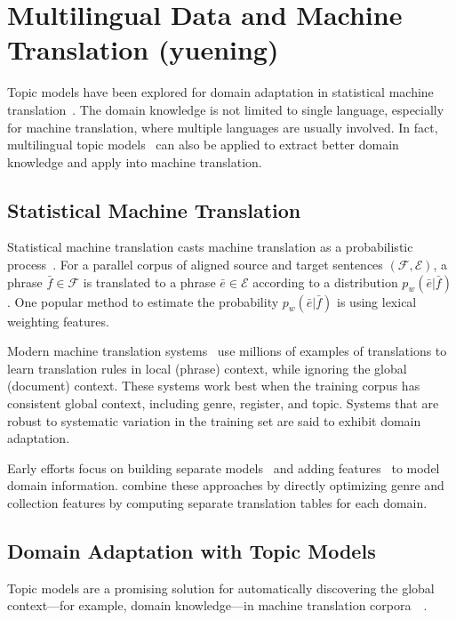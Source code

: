 \chapter{Multilingual Data and Machine Translation (yuening)}
\label{ch:mt}

Topic models have been explored for domain adaptation in statistical machine translation~\citep{Eidelman-12,hu-14}. The domain knowledge is not limited to single language, especially for machine translation, where multiple languages are usually involved. In fact, multilingual topic models~\citep{mimno-09,boyd-graber-10,hu-14} can also be applied to extract better domain knowledge and apply into machine translation.

\section{Statistical Machine Translation}

Statistical machine translation casts machine translation as a probabilistic process~\citep{koehn-09}. For a parallel corpus of aligned source and target sentences $(\mathcal{F}, \mathcal{E})$, a phrase $\bar{f} \in \mathcal{F}$ is translated to a phrase $\bar{e} \in \mathcal{E}$ according to a distribution $p_w(\bar{e}|\bar{f})$.
One popular method to estimate the probability $p_w(\bar{e}|\bar{f})$ is using lexical weighting features.

Modern machine translation systems~\citep{koehn-09} use millions of examples of translations to learn translation rules in local (phrase) context, while ignoring the global (document) context. These systems work best when the training corpus has consistent global context, including genre, register, and topic. Systems that are robust to systematic variation in the training set are said to exhibit domain adaptation.

Early efforts focus on building separate models~\citep{foster-07} and adding features~\citep{matsoukas-09} to model domain information.  \citet{chiang-11} combine these approaches by directly optimizing genre and collection features by computing separate translation tables for each domain.

\section{Domain Adaptation with Topic Models}

Topic models are a promising solution for automatically discovering the global context---for example, domain knowledge---in machine translation corpora~~\citep{Eidelman-12,hu-14}.

